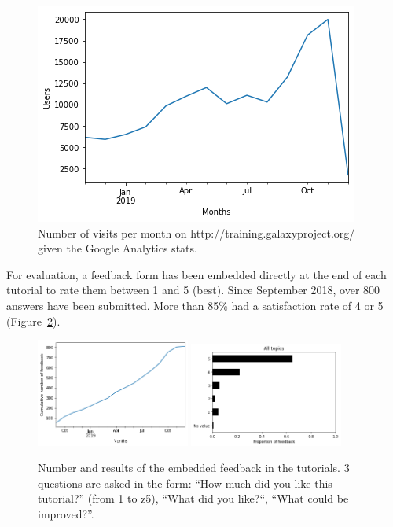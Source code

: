 \documentclass[10pt,letterpaper]{article}
\begin{document}
\begin{figure}[!ht]
	\centering
	\includegraphics[width=\textwidth]{images/visits-per-month.png}
	\caption{Number of visits per month on http://training.galaxyproject.org/ given the Google Analytics stats.
    \label{fig:visits}}
\end{figure}

For evaluation, a feedback form has been embedded directly at the end of each tutorial to rate them between 1 and 5 (best). Since September 2018, over 800 answers have been submitted. More than 85\% had a satisfaction rate of 4 or 5 (Figure~\ref{fig:feedback}).

\begin{figure}[!ht]
	\centering
	\includegraphics[width=0.45\textwidth]{images/feedback.png}
	\includegraphics[width=0.45\textwidth]{images/feedback-scores.png}
	\caption{Number and results of the embedded feedback in the tutorials. 3 questions are asked in the form: ``How much did you like this tutorial?'' (from 1 to z5), ``What did you like?``, ``What could be improved?''.
    \label{fig:feedback}}
\end{figure}
\end{document}
